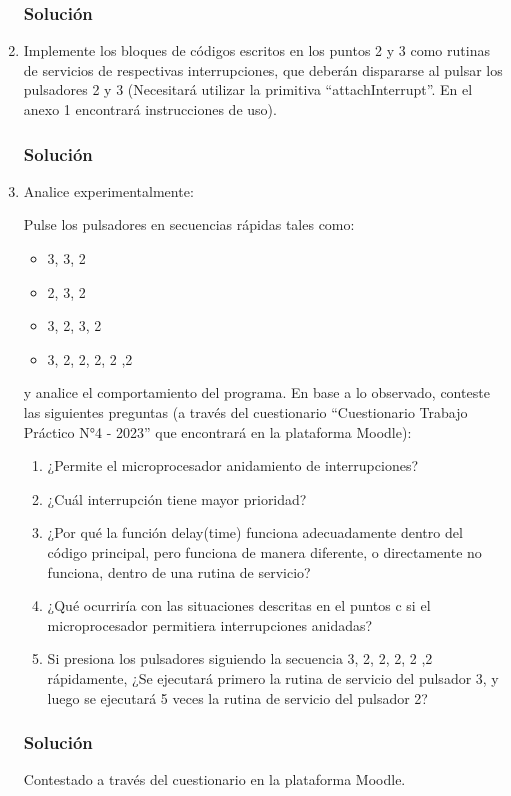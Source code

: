 \documentclass{article}
\begin{document}
\begin{enumerate}[leftmargin=0pt,itemsep=10pt]
\subsubsection*{Solución}


\pagebreak
\item Implemente los bloques de códigos escritos en los puntos 2 y 3 como rutinas de servicios de respectivas interrupciones, que deberán dispararse al pulsar los pulsadores 2 y 3 (Necesitará utilizar la primitiva “attachInterrupt”. En el anexo 1 encontrará instrucciones de uso).

\subsubsection*{Solución}


\item Analice experimentalmente:

Pulse los pulsadores en secuencias rápidas tales como:

\begin{itemize}
    \item 3, 3, 2
    \item 2, 3, 2
    \item 3, 2, 3, 2
    \item 3, 2, 2, 2, 2 ,2
\end{itemize}

y analice el comportamiento del programa. En base a lo observado, conteste las siguientes preguntas (a través del cuestionario “Cuestionario Trabajo Práctico N°4 - 2023” que encontrará en la plataforma Moodle):

\begin{enumerate}
    \item ¿Permite el microprocesador anidamiento de interrupciones?
    \item ¿Cuál interrupción tiene mayor prioridad?
    \item ¿Por qué la función delay(time) funciona adecuadamente dentro del código principal, pero funciona de manera diferente, o directamente no funciona, dentro de una rutina de servicio?
    \item ¿Qué ocurriría con las situaciones descritas en el puntos c si el microprocesador permitiera interrupciones anidadas?
    \item Si presiona los pulsadores siguiendo la secuencia 3, 2, 2, 2, 2 ,2 rápidamente, ¿Se ejecutará primero la rutina de servicio del pulsador 3, y luego se ejecutará 5 veces la rutina de servicio del pulsador 2?
\end{enumerate}

\subsubsection*{Solución}

Contestado a través del cuestionario en la plataforma Moodle.

\end{enumerate}
\end{document}
